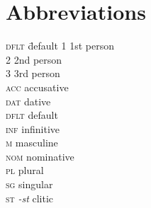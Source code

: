 \documentclass[output=paper]{langscibook}
\begin{document}





\section*{Abbreviations}
\begin{multicols}{3}
\begin{tabbing}
\textsc{dflt}\hspace{.5ex} \= default\kill
\textsc{1}   \> 1st person  \\
\textsc{2}   \> 2nd person \\
\textsc{3}   \> 3rd person \\
\textsc{acc} \> accusative    \\
\textsc{dat} \> dative     \\
\textsc{dflt} \> default    \\
\textsc{inf}  \> infinitive\\
\textsc{m}    \> masculine  \\
\textsc{nom} \> nominative   \\
\textsc{pl}   \> plural     \\
\textsc{sg}   \> singular   \\
\textsc{st}   \> \textit{-st} clitic
\end{tabbing}
\end{multicols}

\printbibliography[heading=subbibliography,notkeyword=this]
\end{document}
